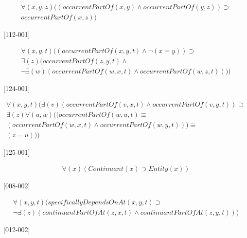 \documentclass{article}
\begin{document}
\begin{flushright}
[123-001] 

\begin{equation}
\begin{split}
{\forall}(x, y, z)((occurrentPartOf(x, y) \wedge occurrentPartOf(y, z)) \supset \\
occurrentPartOf(x, z))
\end{split}
\end{equation}

[112-001] 

\begin{equation}
\begin{split}
{\forall}(x, y, t)((occurrentPartOf(x, y, t) \wedge {\neg}(x = y)) \supset \\
{\exists}(z)(occurrentPartOf(z, y, t) \wedge \\
{\neg}{\exists}(w)(occurrentPartOf(w, x, t) \wedge occurrentPartOf(w, z, t))))
\end{split}
\end{equation}

[124-001] 

\begin{equation}
\begin{split}
{\forall}(x, y, t)({\exists}(v)(occurrentPartOf(v, x, t) \wedge occurrentPartOf(v, y, t)) \supset \\
{\exists}(z){\forall}(u, w)((occurrentPartOf(w, u, t) \equiv \\
(occurrentPartOf(w, x, t) \wedge occurrentPartOf(w, y, t))) \equiv \\
(z = u)))
\end{split}
\end{equation}

[125-001] 

\begin{equation}
\begin{split}
{\forall}(x)(Continuant(x) \supset Entity(x))
\end{split}
\end{equation}

[008-002] 

\begin{equation}
\begin{split}
{\forall}(x, y, t)(specificallyDependsOnAt(x, y, t) \supset \\
{\neg}{\exists}(z)(continuantPartOfAt(z, x, t) \wedge continuantPartOfAt(z, y, t)))
\end{split}
\end{equation}

[012-002] 


\end{flushright}
\end{document}
